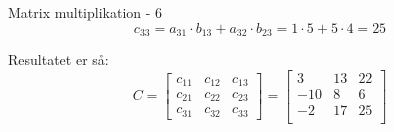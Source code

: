 \documentclass{article}
\begin{document}
\begin{exercise}{Matrix multiplikation - 6}
\hint
\[
c_{33} = a_{31} \cdot b_{13} + a_{32} \cdot b_{23} = 1 \cdot 5 + 5 \cdot 4 = 25
\]



\hint
Resultatet er så:
\[
C = \left[\begin{array}{rrr}
c_{11} & c_{12} & c_{13} \\
c_{21} & c_{22} & c_{23} \\
c_{31} & c_{32} & c_{33}
\end{array} \right] =
\left[\begin{array}{rrr}
3 & 13 & 22 \\
-10 & 8 & 6 \\
-2 & 17 & 25 \\
\end{array} \right]
\]


\end{exercise}

\newpage
\end{document}
